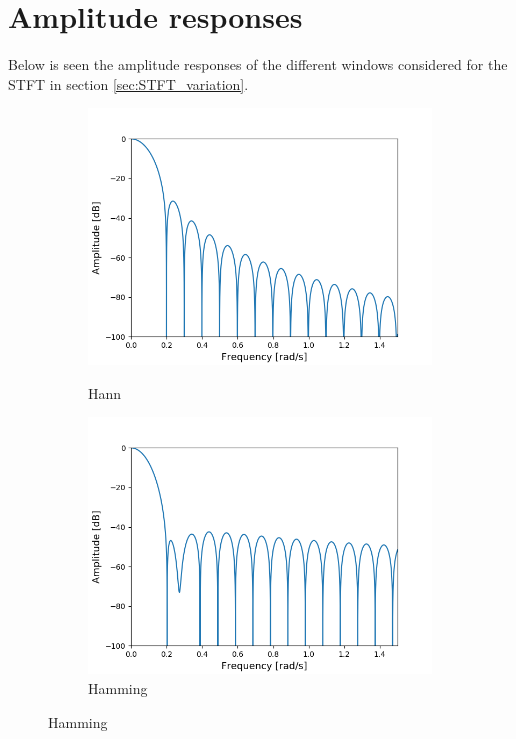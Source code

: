 \chapter{Amplitude responses}\label{appD}
Below is seen the amplitude responses of the different windows considered for the STFT in section \ref{sec:STFT_variation}.

\begin{figure}[H]
\centering
\begin{subfigure}{0.49\textwidth}
\centering
\includegraphics[width=\textwidth]{figures/dbplots/stft_bilag/64/hann.png}
\caption{Hann}
\includegraphics[width=\textwidth]{figures/dbplots/stft_bilag/64/hamming.png}
\caption{Hamming}

\end{subfigure}
\end{figure}
